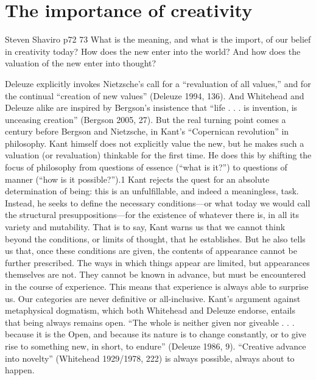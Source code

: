 \section{The importance of creativity}
\cite{[p72-p73]shaviro2012without}

Steven Shaviro
p72 73
What is the meaning, and what is the import, of our belief in creativity
today?
How does the new enter into the world? 
And how does the valuation
of the new enter into thought? 

Deleuze explicitly invokes Nietzsche’s call for a
“revaluation of all values,” and for the continual “creation of new values”
(Deleuze 1994, 136). And Whitehead and Deleuze alike are inspired by
Bergson’s insistence that “life . . . is invention, is unceasing creation” (Bergson
2005, 27). But the real turning point comes a century before Bergson and
Nietzsche, in Kant’s “Copernican revolution” in philosophy. Kant himself
does not explicitly value the new, but he makes such a valuation (or revaluation)
thinkable for the first time. He does this by shifting the focus of philosophy
from questions of essence (“what is it?”) to questions of manner (“how
is it possible?”).1 Kant rejects the quest for an absolute determination of being:
this is an unfulfillable, and indeed a meaningless, task. Instead, he seeks
to define the necessary conditions—or what today we would call the structural
presuppositions—for the existence of whatever there is, in all its variety
and mutability. That is to say, Kant warns us that we cannot think beyond the
conditions, or limits of thought, that he establishes. But he also tells us that,
once these conditions are given, the contents of appearance cannot be further
prescribed. The ways in which things appear are limited, but appearances
themselves are not. They cannot be known in advance, but must be encountered
in the course of experience. This means that experience is always able to
surprise us. Our categories are never definitive or all-inclusive. Kant’s argument
against metaphysical dogmatism, which both Whitehead and Deleuze
endorse, entails that being always remains open. “The whole is neither given
nor giveable . . . because it is the Open, and because its nature is to change
constantly, or to give rise to something new, in short, to endure” (Deleuze
1986, 9). “Creative advance into novelty” (Whitehead 1929/1978, 222) is always
possible, always about to happen.





